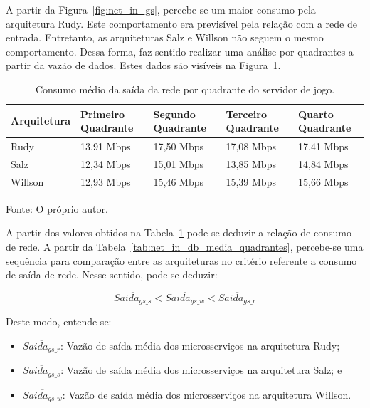 A partir da Figura~\ref{fig:net_in_gs}, percebe-se um maior consumo pela arquitetura Rudy.
%
Este comportamento era previsível pela relação com a rede de entrada.
%
Entretanto, as arquiteturas Salz e Willson não seguem o mesmo comportamento.
%
Dessa forma, faz sentido realizar uma análise por quadrantes a partir da vazão de dados.
%
Estes dados são visíveis na Figura~\ref{tab:net_out_gs_media_quadrantes}.

\begin{table}[htb!]
\centering
\begin{adjustbox}{max width=\textwidth}
\caption{Consumo médio da saída da rede por quadrante do servidor de jogo.}
\label{tab:net_out_gs_media_quadrantes}

\begin{tabular}{l|l|l|l|l}
\hline \hline
Arquitetura & Primeiro Quadrante & Segundo Quadrante & Terceiro Quadrante & Quarto Quadrante \\ \hline \hline
Rudy        & 13,91 Mbps            & 17,50 Mbps           & 17,08 Mbps            & 17,41 Mbps          \\ \hline
Salz        & 12,34 Mbps            & 15,01 Mbps           & 13,85 Mbps            & 14,84 Mbps          \\ \hline
Willson     & 12,93 Mbps            & 15,46 Mbps          & 15,39 Mbps            & 15,66 Mbps          \\ \hline \hline
\end{tabular}
\end{adjustbox}

Fonte: O próprio autor.
\end{table}

A partir dos valores obtidos na Tabela~\ref{tab:net_out_gs_media_quadrantes} pode-se deduzir a relação de consumo de rede.
%
A partir da Tabela~\ref{tab:net_in_db_media_quadrantes}, percebe-se uma sequência para comparação entre as arquiteturas no critério referente a consumo de saída de rede.
%
Nesse sentido, pode-se deduzir:

$$
    \overline{Saida_{gs\_s}} < \overline{Saida_{gs\_w}} < \overline{Saida_{gs\_r}}
$$

Deste modo, entende-se:

\begin{itemize}
 \item $\overline{Saida_{gs\_r}}$: Vazão de saída média dos microsserviços na arquitetura Rudy;
 \item $\overline{Saida_{gs\_s}}$: Vazão de saída média dos microsserviços na arquitetura Salz; e
 \item $\overline{Saida_{gs\_w}}$: Vazão de saída média dos microsserviços na arquitetura Willson.
\end{itemize}

